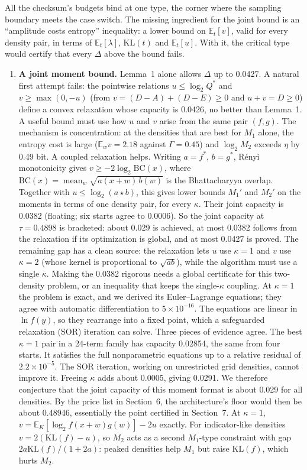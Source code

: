 \documentclass[11pt]{article}
\DeclareMathOperator{\mean}{mean}
\newcommand{\E}{\mathbb{E}}
\newcommand{\KL}{\mathrm{KL}}
\theoremstyle{plain}
\begin{document}
All the checksum's budgets bind at one type, the corner where the sampling boundary meets the case switch. The missing ingredient for the joint bound is an ``amplitude costs entropy'' inequality: a lower bound on $\E_t[v]$, valid for every density pair, in terms of $\E_t[\lambda]$, $\KL(t)$ and $\E_t[u]$. With it, the critical type would certify that every $\Delta$ above the bound fails.

\begin{enumerate}
\item \textbf{A joint moment bound.} Lemma~1 alone allows $\Delta$ up to 0.0427. A natural first attempt fails: the pointwise relations $u \le \log_2 Q^*$ and $v \ge \max(0, -u)$ (from $v = (D-A) + (D-E) \ge 0$ and $u + v = D \ge 0$) define a convex relaxation whose capacity is 0.0426, no better than Lemma~1. A useful bound must use how $u$ and $v$ arise from the same pair $(f, g)$. The mechanism is concentration: at the densities that are best for $M_1$ alone, the entropy cost is large ($\E_w v = 2.18$ against $\Gamma = 0.45$) and $\log_2 M_2$ exceeds $\eta$ by 0.49 bit. A coupled relaxation helps. Writing $a = f^*$, $b = g^*$, R\'enyi monotonicity gives $v \ge -2 \log_2 \mathrm{BC}(x)$, where $\mathrm{BC}(x) = \mean_w \sqrt{a(x+w)\, b(w)}$ is the Bhattacharyya overlap. Together with $u \le \log_2 (a \star b)$, this gives lower bounds $M_1'$ and $M_2'$ on the moments in terms of one density pair, for every $\kappa$. Their joint capacity is 0.0382 (floating; six starts agree to 0.0006). So the joint capacity at $\tau = 0.4898$ is bracketed: about 0.029 is achieved, at most 0.0382 follows from the relaxation if its optimization is global, and at most 0.0427 is proved. The remaining gap has a clean source: the relaxation lets $u$ use $\kappa = 1$ and $v$ use $\kappa = 2$ (whose kernel is proportional to $\sqrt{ab}$), while the algorithm must use a single $\kappa$. Making the 0.0382 rigorous needs a global certificate for this two-density problem, or an inequality that keeps the single-$\kappa$ coupling. At $\kappa = 1$ the problem is exact, and we derived its Euler--Lagrange equations; they agree with automatic differentiation to $5\times10^{-16}$. The equations are linear in $\ln f(y)$, so they rearrange into a fixed point, which a safeguarded relaxation (SOR) iteration can solve. Three pieces of evidence agree. The best $\kappa = 1$ pair in a 24-term family has capacity 0.02854, the same from four starts. It satisfies the full nonparametric equations up to a relative residual of $2.2\times10^{-5}$. The SOR iteration, working on unrestricted grid densities, cannot improve it. Freeing $\kappa$ adds about 0.0005, giving 0.0291. We therefore conjecture that the joint capacity of this moment format is about 0.029 for all densities. By the price list in Section~6, the architecture's floor would then be about 0.48946, essentially the point certified in Section~7. At $\kappa = 1$, $v = \E_K[\log_2 f(x+w)g(w)] - 2u$ exactly. For indicator-like densities $v = 2(\KL(f) - u)$, so $M_2$ acts as a second $M_1$-type constraint with gap $2a \KL(f)/(1+2a)$: peaked densities help $M_1$ but raise $\KL(f)$, which hurts $M_2$.

\end{enumerate}
\end{document}
